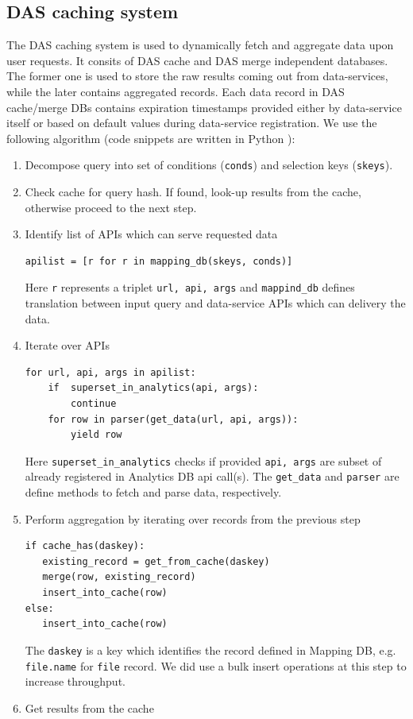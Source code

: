 \documentclass[1p,times]{elsarticle}
\begin{document}

\subsection{DAS caching system}
The DAS caching system is used to dynamically fetch
and aggregate data upon user requests. It consits of
DAS cache and DAS merge independent databases. The former one is used to store
the raw results coming out from data-services, while the later contains aggregated
records. Each data record in DAS cache/merge DBs contains expiration timestamps 
provided either by data-service itself or based on default values during 
data-service registration.
We use the following algorithm (code snippets are written in Python \cite{Python}):
\begin{enumerate}[1.]
\item Decompose query into set of conditions (\verb+conds+) 
and selection keys (\verb+skeys+).
\item Check cache for query hash. If found, look-up results from the cache,
otherwise proceed to the next step.
\item Identify list of APIs which can serve requested data
\begin{verbatim}
apilist = [r for r in mapping_db(skeys, conds)]
\end{verbatim}
Here \verb+r+ represents a triplet \verb+url, api, args+ and 
\verb+mappind_db+ defines translation between input query and data-service
APIs which can delivery the data.
\item Iterate over APIs
\begin{verbatim}
for url, api, args in apilist:
    if  superset_in_analytics(api, args):
        continue
    for row in parser(get_data(url, api, args)):
        yield row
\end{verbatim}
Here \verb+superset_in_analytics+ checks if provided \verb+api, args+
are subset of already registered in Analytics DB api call(s). The 
\verb+get_data+ and \verb+parser+ are define methods to fetch and parse
data, respectively.
\item Perform aggregation by iterating over records from the previous step
\begin{verbatim}
if cache_has(daskey):
   existing_record = get_from_cache(daskey)
   merge(row, existing_record)
   insert_into_cache(row)
else:
   insert_into_cache(row)
\end{verbatim}
The \verb+daskey+
is a key which identifies the record defined in Mapping DB, e.g. \verb+file.name+
for \verb+file+ record.
We did use a bulk insert operations at this step to increase throughput. 
\item Get results from the cache
\end{enumerate}
\end{document}
